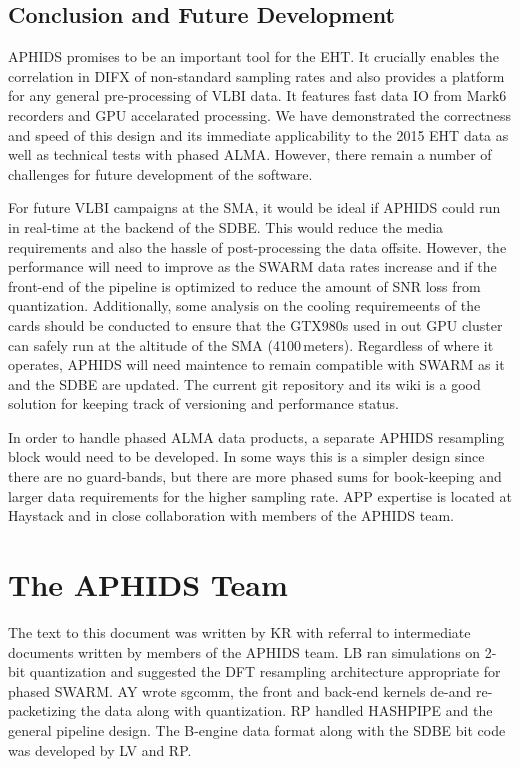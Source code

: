 \subsection{Conclusion and Future Development}

APHIDS promises to be an important tool for the EHT.  It crucially enables the correlation in
DIFX of non-standard sampling rates and also provides a platform for any general pre-processing of 
VLBI data.  It features fast data IO from Mark6 recorders and GPU accelarated processing.  
We have demonstrated the correctness and speed of this design and its immediate applicability to 
the 2015 EHT data as well as technical tests with phased ALMA.  However,
there remain a number of challenges for future development of the software.

For future VLBI campaigns at the SMA, it would be ideal if APHIDS could run in real-time 
at the backend of the SDBE.  This would reduce the media requirements and also the 
hassle of post-processing the data offsite.  However, the performance will need to improve as the
SWARM data rates increase and if the front-end of the pipeline is optimized to reduce the 
amount of SNR loss from quantization.  Additionally, some analysis on the cooling requiremeents 
of the cards should be conducted to ensure that the GTX980s used in out GPU cluster can safely run 
at the altitude of the SMA (4100\,meters).  Regardless of where it operates, APHIDS will need 
maintence to remain compatible with SWARM as it and the SDBE are updated.  The current 
git repository and its wiki is a good solution for keeping track of versioning and performance status.

In order to handle phased ALMA data products, a separate APHIDS resampling block would need 
to be developed.  In some ways this is a simpler design since there are no guard-bands, but 
there are more phased sums for book-keeping and larger data requirements for the higher 
sampling rate. APP expertise is located at Haystack and in close collaboration with members of 
the APHIDS team.  

\section{The APHIDS Team}
The text to this document was written by KR with referral to intermediate documents written by
members of the APHIDS team.  LB ran simulations on 2-bit quantization and suggested the DFT resampling 
architecture appropriate for phased SWARM. AY wrote sgcomm, the front and back-end kernels de-and re-packetizing 
the data along with quantization. RP handled HASHPIPE and the general pipeline design.  The B-engine data format 
along with the SDBE bit code was developed by LV and RP.
